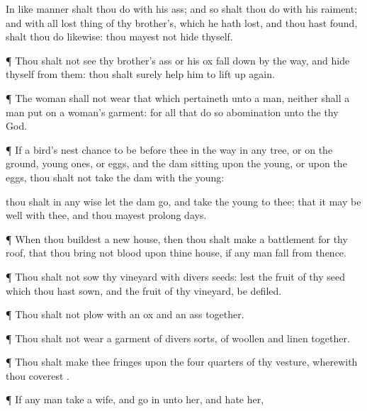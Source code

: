 {In like
manner shalt thou
do with his
ass; and so shalt thou
do with his
raiment; and with all lost
thing of thy
brother’s, which he hath
lost, and thou hast
found, shalt thou
do likewise: thou
mayest not
hide thyself.


\par }{\PP {}¶ Thou shalt not
see thy
brother’s
ass or his
ox fall
down by the
way, and
hide thyself from them: thou shalt
surely help him to lift
{} up
again.


\par }{\PP {}¶ The
woman shall not wear that which
pertaineth unto a
man, neither shall a
man
put on a
woman’s
garment: for all that
do
so
{}
abomination unto the
{} thy
God.


\par }{\PP {}¶ If a
bird’s
nest
chance to be
before thee in the
way in any
tree, or on the
ground,
{} young
ones, or
eggs, and the
dam
sitting upon the
young, or upon the
eggs, thou shalt not
take the
dam with the
young:

 thou shalt in any
wise let the
dam
go, and
take the
young to thee; that it may be
well with thee, and
{} thou mayest
prolong
{}
days.


\par }{\PP {}¶ When thou
buildest a
new
house, then thou shalt
make a
battlement for thy
roof, that thou
bring not
blood upon thine
house, if any
man
fall from thence.


\par }{\PP {}¶ Thou shalt not
sow thy
vineyard with divers
seeds: lest the
fruit of thy
seed which thou hast
sown, and the
fruit of thy
vineyard, be
defiled.


\par }{\PP {}¶ Thou shalt not
plow with an
ox and an
ass
together.


\par }{\PP {}¶ Thou shalt not
wear a garment of divers
sorts,
{} of
woollen and
linen
together.


\par }{\PP {}¶ Thou shalt
make thee
fringes upon the
four
quarters of thy
vesture, wherewith thou
coverest
{}.


\par }{\PP {}¶ If any
man
take a
wife, and go
in unto her, and
hate her,

}
